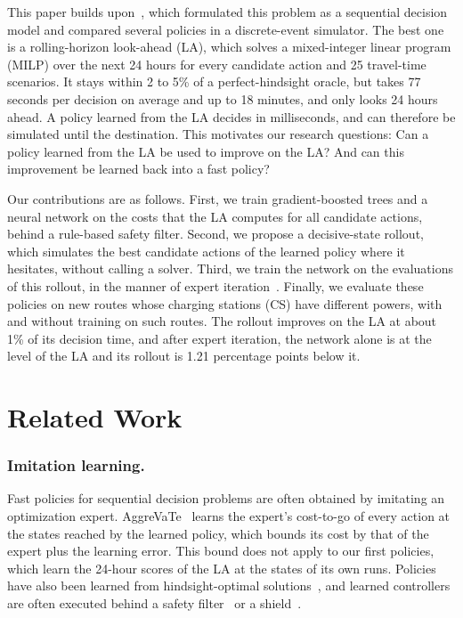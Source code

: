 \documentclass[runningheads]{llncs}
\begin{document}
This paper builds upon~\cite{pagnier2026scheduling}, which formulated this
problem as a sequential decision model and compared several policies in a
discrete-event simulator. The best one is a rolling-horizon look-ahead (LA),
which solves a mixed-integer linear program (MILP) over the next 24 hours for
every candidate action and 25 travel-time scenarios. It stays within 2 to 5\%
of a perfect-hindsight oracle, but takes 77 seconds per decision on average
and up to 18 minutes, and only looks 24 hours ahead. A policy learned from the
LA decides in milliseconds, and can therefore be simulated until the
destination. This motivates our research questions: Can a policy learned from
the LA be used to improve on the LA? And can this improvement be learned back
into a fast policy?

Our contributions are as follows. First, we train gradient-boosted trees and a
neural network on the costs that the LA computes for all candidate actions,
behind a rule-based safety filter. Second, we propose a decisive-state
rollout, which simulates the best candidate actions of the learned policy
where it hesitates, without calling a solver. Third, we train the network on
the evaluations of this rollout, in the manner of expert
iteration~\cite{anthony2017}. Finally, we evaluate these policies on new
routes whose charging stations (CS) have different powers, with and without
training on such routes. The rollout improves on the LA at about 1\% of its
decision time, and after expert iteration, the network alone is at the level
of the LA and its rollout is 1.21 percentage points below it.

\section{Related Work}
\label{sec:related}

\subsubsection{Imitation learning.}
Fast policies for sequential decision problems are often obtained by imitating
an optimization expert. AggreVaTe~\cite{ross_bagnell2014,sun2017aggrevated}
learns the expert's cost-to-go of every action at the states reached by the
learned policy, which bounds its cost by that of the expert plus the learning
error. This bound does not apply to our first policies, which learn the
24-hour scores of the LA at the states of its own runs. Policies have also been learned from hindsight-optimal
solutions~\cite{baty2024,sinclair2023}, and learned controllers are often
executed behind a safety filter~\cite{wabersich2021} or a
shield~\cite{alshiekh2018}.
\end{document}
